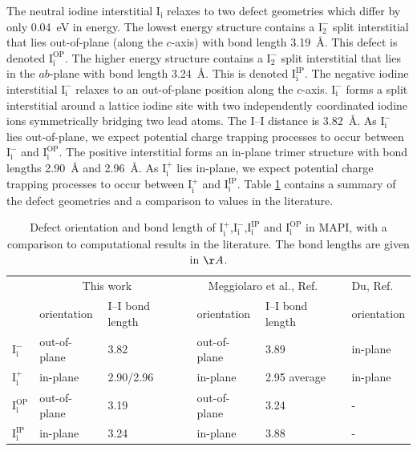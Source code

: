The neutral iodine interstitial $\mathrm{I}_\mathrm{i}$ relaxes to two defect geometries which differ by only \SI{0.04}{\electronvolt} in energy. The lowest energy structure contains a $\mathrm{I}_2^-$ split interstitial that lies out-of-plane (along the $c$-axis) with bond length \SI{3.19}{\angstrom}. This defect is denoted $\mathrm{I}_\mathrm{i}^{\textrm{OP}}$. The higher energy structure contains a $\mathrm{I}_2^-$ split interstitial that lies in the $ab$-plane with bond length \SI{3.24}{\angstrom}. This is denoted $\mathrm{I}_\mathrm{i}^{\textrm{IP}}$. The negative iodine interstitial 
$\mathrm{I}_\mathrm{i}^-$ relaxes to an out-of-plane position along the $c$-axis. $\mathrm{I}_\mathrm{i}^-$ forms a split interstitial around a lattice iodine site with two independently coordinated iodine ions symmetrically bridging two lead atoms. The I--I distance is \SI{3.82}{\angstrom}. As $\mathrm{I}_\mathrm{i}^-$ lies out-of-plane, we expect potential charge trapping processes to occur between $\mathrm{I}_\mathrm{i}^-$ and $\mathrm{I}_\mathrm{i}^{\textrm{OP}}$. The positive interstitial forms an in-plane trimer structure with bond lengths \SI{2.90}{\angstrom} and \SI{2.96}{\angstrom}. As $\mathrm{I}_\mathrm{i}^+$ lies in-plane, we expect potential charge trapping processes to occur between $\mathrm{I}_\mathrm{i}^+$ and $\mathrm{I}_\mathrm{i}^{\textrm{IP}}$.
Table \ref{compare_geoms} contains a summary of the defect geometries and a comparison to values in the literature.

\begin{table}[h!]\centering
\begin{tabular}{llllllll}\toprule
\phantom{abcd}&\multicolumn{2}{c}{This work} &\phantom{a} &\multicolumn{2}{c}{Meggiolaro et al., Ref. \cite{Meggiolaro2018}}&\phantom{a} & Du, Ref. \cite{Du2015} \\
\cline{2-3} \cline{5-6} \cline{8-8}
& orientation & I--I bond length && orientation & I--I bond length  && orientation \\  
\midrule
$\mathrm{I}_\mathrm{i}^-$ &  out-of-plane & 3.82  &&  out-of-plane & 3.89 && in-plane \\
$\mathrm{I}_\mathrm{i}^+$ & in-plane & 2.90/2.96 && in-plane & 2.95 average && in-plane \\
$\mathrm{I}_\mathrm{i}^\mathrm{OP}$ & out-of-plane & 3.19 && out-of-plane & 3.24 && - \\
$\mathrm{I}_\mathrm{i}^\mathrm{IP}$ & in-plane & 3.24 && in-plane & 3.88 && - \\
\end{tabular} 
\caption[Defect orientation and bond length of $\mathrm{I}_\mathrm{i}^+$, $\mathrm{I}_\mathrm{i}^-$ and $\mathrm{I}_\mathrm{i}^0$]{\label{compare_geoms}Defect orientation and bond length of $\mathrm{I}_\mathrm{i}^+$,$\mathrm{I}_\mathrm{i}^-$,$\mathrm{I}_\mathrm{i}^\mathrm{IP}$ and $\mathrm{I}_\mathrm{i}^\mathrm{OP}$ in MAPI, with a comparison to computational results in the literature. The bond lengths are given in $\AA$.}
\end{table}

